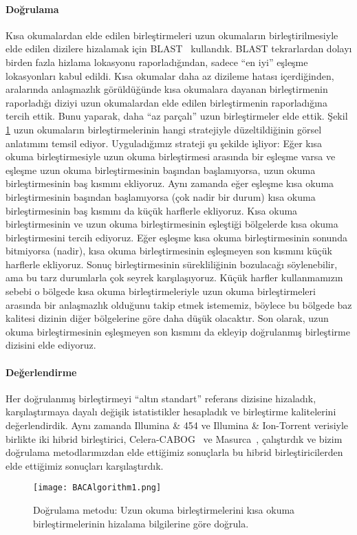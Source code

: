 \paragraph{Doğrulama} 
Kısa okumalardan elde edilen birleştirmeleri uzun okumaların birleştirilmesiyle elde edilen dizilere hizalamak için BLAST~\cite{Altschul1990} kullandık.
BLAST tekrarlardan dolayı birden fazla hizlama lokasyonu raporladığından, sadece ``en iyi'' eşleşme lokasyonları kabul edildi.
Kısa okumalar daha az dizileme hatası içerdiğinden, aralarında anlaşmazlık görüldüğünde kısa okumalara dayanan birleştirmenin raporladığı diziyi uzun okumalardan elde edilen birleştirmenin raporladığına tercih ettik.
Bunu yaparak, daha ``az parçalı'' uzun birleştirmeler elde ettik. Şekil \ref{correction} uzun okumaların birleştirmelerinin hangi stratejiyle düzeltildiğinin görsel anlatımını temsil ediyor. 
Uyguladığımız strateji şu şekilde işliyor: Eğer kısa okuma birleştirmesiyle uzun okuma birleştirmesi arasında bir eşleşme varsa ve eşleşme uzun okuma birleştirmesinin başından başlamıyorsa, uzun okuma birleştirmesinin baş kısmını ekliyoruz.
Aynı zamanda eğer eşleşme kısa okuma birleştirmesinin başından başlamıyorsa (çok nadir bir durum) kısa okuma birleştirmesinin baş kısmını da küçük harflerle ekliyoruz. 
Kısa okuma birleştirmesinin ve uzun okuma birleştirmesinin eşleştiği bölgelerde kısa okuma birleştirmesini tercih ediyoruz. 
Eğer eşleşme kısa okuma birleştirmesinin sonunda bitmiyorsa (nadir), kısa okuma birleştirmesinin eşleşmeyen son kısmını küçük harflerle ekliyoruz.
Sonuç birleştirmesinin sürekliliğinin bozulacağı söylenebilir, ama bu tarz durumlarla çok seyrek karşılaşıyoruz.
Küçük harfler kullanmamızın sebebi o bölgede kısa okuma birleştirmeleriyle uzun okuma birleştirmeleri arasında bir anlaşmazlık olduğunu takip etmek istememiz, böylece bu bölgede baz kalitesi dizinin diğer bölgelerine göre daha düşük olacaktır.
Son olarak, uzun okuma birleştirmesinin eşleşmeyen son kısmını da ekleyip doğrulanmış birleştirme dizisini elde ediyoruz.  

\paragraph{Değerlendirme}
Her doğrulanmış birleştirmeyi ``altın standart'' referans dizisine  hizaladık, karşılaştırmaya dayalı değişik istatistikler hesapladık ve birleştirme kalitelerini değerlendirdik.
Aynı zamanda Illumina \& 454 ve Illumina \& Ion-Torrent verisiyle birlikte iki hibrid birleştirici, Celera-CABOG~\cite{Miller2008} ve Masurca~\cite{Zimin2013}, çalıştırdık ve bizim doğrulama metodlarımızdan elde ettiğimiz sonuçlarla bu hibrid birleştiricilerden elde ettiğimiz sonuçları karşılaştırdık.

\begin{figure}[htbp]
\begin{center}
  \texttt{[image: BACAlgorithm1.png]}
\end{center}
  \caption{Doğrulama metodu: Uzun okuma birleştirmelerini kısa okuma birleştirmelerinin hizalama bilgilerine göre doğrula.}
  \label{correction}
\end{figure}








